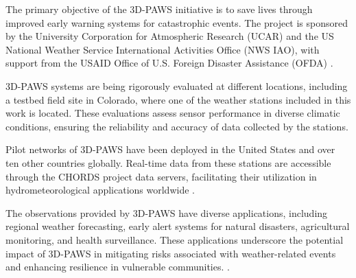 The primary objective of the 3D-PAWS initiative is to save lives through improved early warning systems for catastrophic events. The project is sponsored by the University Corporation for Atmospheric Research (UCAR) and the US National Weather Service International Activities Office (NWS IAO), with support from the USAID Office of U.S. Foreign Disaster Assistance (OFDA) \cite{3dpaws_manual}.

3D-PAWS systems are being rigorously evaluated at different locations, including a testbed field site in Colorado, where one of the weather stations included in this work is located. These evaluations assess sensor performance in diverse climatic conditions, ensuring the reliability and accuracy of data collected by the stations. \cite{muita2021}

Pilot networks of 3D-PAWS have been deployed in the United States and over ten other countries globally. Real-time data from these stations are accessible through the CHORDS project data servers, facilitating their utilization in hydrometeorological applications worldwide \cite{3dpaws_manual}.

The observations provided by 3D-PAWS have diverse applications, including regional weather forecasting, early alert systems for natural disasters, agricultural monitoring, and health surveillance. These applications underscore the potential impact of 3D-PAWS in mitigating risks associated with weather-related events and enhancing resilience in vulnerable communities. \cite{3dpaws_manual}.